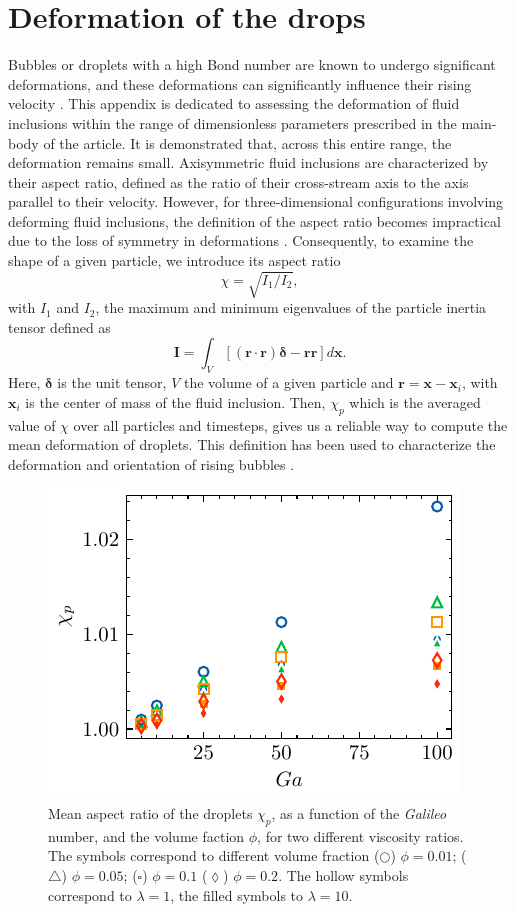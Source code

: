 
\section{Deformation of the drops}
\label{ap:deformation} 

Bubbles or droplets with a high Bond number are known to undergo significant deformations, and these deformations can significantly influence their rising velocity \citep{bunner2003effect,tripathi2014}. 
This appendix is dedicated to assessing the deformation of fluid inclusions within the range of dimensionless parameters prescribed in the main-body of the article. 
It is demonstrated that, across this entire range, the deformation remains small. 
Axisymmetric fluid inclusions are characterized by their aspect ratio, defined as the ratio of their cross-stream axis to the axis parallel to their velocity. 
However, for three-dimensional configurations involving deforming fluid inclusions, the definition of the aspect ratio becomes impractical due to the loss of symmetry in deformations \citep{bunner2003effect}. 
Consequently, to examine the shape of a given particle, we introduce its aspect ratio  
\begin{equation}
    \chi =  \sqrt{I_1 /I_2},
\end{equation}
with $I_1$ and $I_2$, the maximum and minimum eigenvalues of the particle inertia tensor defined as
\begin{equation*}
    \textbf{I}
    = \int_{V} \left[
        (\textbf{r}\cdot \textbf{r}) \bm\delta  - \textbf{rr}
        \right]
    d\textbf{x}.
\end{equation*}
Here, $\bm\delta$ is the unit tensor, $V$ the volume of a given particle and $\textbf{r} = \textbf{x} - \textbf{x}_i$, with $\textbf{x}_i$ is the center of mass of the fluid inclusion. 
Then, $\chi_p$ which is the averaged value of $\chi$ over all particles and timesteps, gives us a reliable way to compute the mean deformation of droplets. 
This definition has been used to characterize the deformation and orientation of rising bubbles \citep{bunner2003effect}. 
\begin{figure}[h!]
    \centering
    \includegraphics[height = 0.3\textwidth]{image/HOMOGENEOUS_NEW/PA/chi.pdf}
    \caption{Mean aspect ratio of the droplets $\chi_p$, as a function of the \textit{Galileo} number, and the volume faction $\phi$,  for two different viscosity ratios.  
    The symbols correspond to different volume fraction ($\pmb\bigcirc$) $\phi = 0.01$; ($\pmb\triangle$) $ \phi = 0.05$; ($\pmb\square$) $\phi = 0.1$ ($\pmb\lozenge$) $\phi = 0.2$.
    The hollow symbols correspond to $\lambda = 1$, the filled symbols to $\lambda = 10$.
    }
    \label{fig:chi}
\end{figure}
